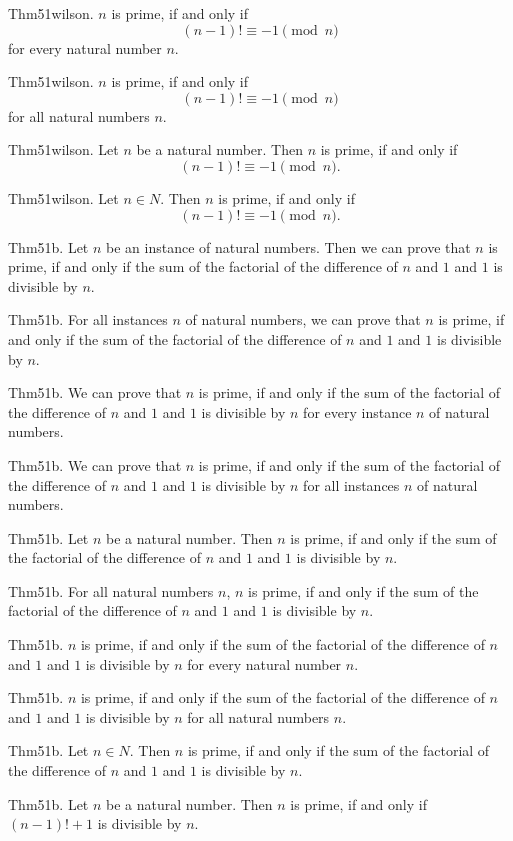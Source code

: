 \documentclass{article}
\begin{document}
Thm51wilson. $n$ is prime, if and only if $$(n - 1)! \equiv - 1 \pmod{ n}$$ for every natural number $n$.

Thm51wilson. $n$ is prime, if and only if $$(n - 1)! \equiv - 1 \pmod{ n}$$ for all natural numbers $n$.

Thm51wilson. Let $n$ be a natural number. Then $n$ is prime, if and only if $$(n - 1)! \equiv - 1 \pmod{ n}.$$

Thm51wilson. Let $n \in N$. Then $n$ is prime, if and only if $$(n - 1)! \equiv - 1 \pmod{ n}.$$

Thm51b. Let $n$ be an instance of natural numbers. Then we can prove that $n$ is prime, if and only if the sum of the factorial of the difference of $n$ and $1$ and $1$ is divisible by $n$.

Thm51b. For all instances $n$ of natural numbers, we can prove that $n$ is prime, if and only if the sum of the factorial of the difference of $n$ and $1$ and $1$ is divisible by $n$.

Thm51b. We can prove that $n$ is prime, if and only if the sum of the factorial of the difference of $n$ and $1$ and $1$ is divisible by $n$ for every instance $n$ of natural numbers.

Thm51b. We can prove that $n$ is prime, if and only if the sum of the factorial of the difference of $n$ and $1$ and $1$ is divisible by $n$ for all instances $n$ of natural numbers.

Thm51b. Let $n$ be a natural number. Then $n$ is prime, if and only if the sum of the factorial of the difference of $n$ and $1$ and $1$ is divisible by $n$.

Thm51b. For all natural numbers $n$, $n$ is prime, if and only if the sum of the factorial of the difference of $n$ and $1$ and $1$ is divisible by $n$.

Thm51b. $n$ is prime, if and only if the sum of the factorial of the difference of $n$ and $1$ and $1$ is divisible by $n$ for every natural number $n$.

Thm51b. $n$ is prime, if and only if the sum of the factorial of the difference of $n$ and $1$ and $1$ is divisible by $n$ for all natural numbers $n$.

Thm51b. Let $n \in N$. Then $n$ is prime, if and only if the sum of the factorial of the difference of $n$ and $1$ and $1$ is divisible by $n$.

Thm51b. Let $n$ be a natural number. Then $n$ is prime, if and only if $(n - 1)! + 1$ is divisible by $n$.
\end{document}
